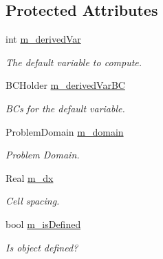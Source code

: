 \subsection*{Protected Attributes}
\begin{DoxyCompactItemize}
\item 
\hypertarget{class_compute_enthalpy_vars_aeb04519770bb9cbc61f86aeb0dedb252}{int \hyperlink{class_compute_enthalpy_vars_aeb04519770bb9cbc61f86aeb0dedb252}{m\-\_\-derived\-Var}}\label{class_compute_enthalpy_vars_aeb04519770bb9cbc61f86aeb0dedb252}

\begin{DoxyCompactList}\small\item\em The default variable to compute. \end{DoxyCompactList}\item 
\hypertarget{class_compute_enthalpy_vars_a2e1e5ba2d1f1d28441f223ab69c16428}{B\-C\-Holder \hyperlink{class_compute_enthalpy_vars_a2e1e5ba2d1f1d28441f223ab69c16428}{m\-\_\-derived\-Var\-B\-C}}\label{class_compute_enthalpy_vars_a2e1e5ba2d1f1d28441f223ab69c16428}

\begin{DoxyCompactList}\small\item\em B\-Cs for the default variable. \end{DoxyCompactList}\item 
\hypertarget{class_compute_enthalpy_vars_acb0f6e8a6b90c75a22ec5427a757b526}{Problem\-Domain \hyperlink{class_compute_enthalpy_vars_acb0f6e8a6b90c75a22ec5427a757b526}{m\-\_\-domain}}\label{class_compute_enthalpy_vars_acb0f6e8a6b90c75a22ec5427a757b526}

\begin{DoxyCompactList}\small\item\em Problem Domain. \end{DoxyCompactList}\item 
\hypertarget{class_compute_enthalpy_vars_a4317ccd11d6b577039cb6a9d30f765ee}{Real \hyperlink{class_compute_enthalpy_vars_a4317ccd11d6b577039cb6a9d30f765ee}{m\-\_\-dx}}\label{class_compute_enthalpy_vars_a4317ccd11d6b577039cb6a9d30f765ee}

\begin{DoxyCompactList}\small\item\em Cell spacing. \end{DoxyCompactList}\item 
\hypertarget{class_compute_enthalpy_vars_ae9d0f5b51510e9ca705906942e42b4f9}{bool \hyperlink{class_compute_enthalpy_vars_ae9d0f5b51510e9ca705906942e42b4f9}{m\-\_\-is\-Defined}}\label{class_compute_enthalpy_vars_ae9d0f5b51510e9ca705906942e42b4f9}

\begin{DoxyCompactList}\small\item\em Is object defined? \end{DoxyCompactList}\end{DoxyCompactItemize}


